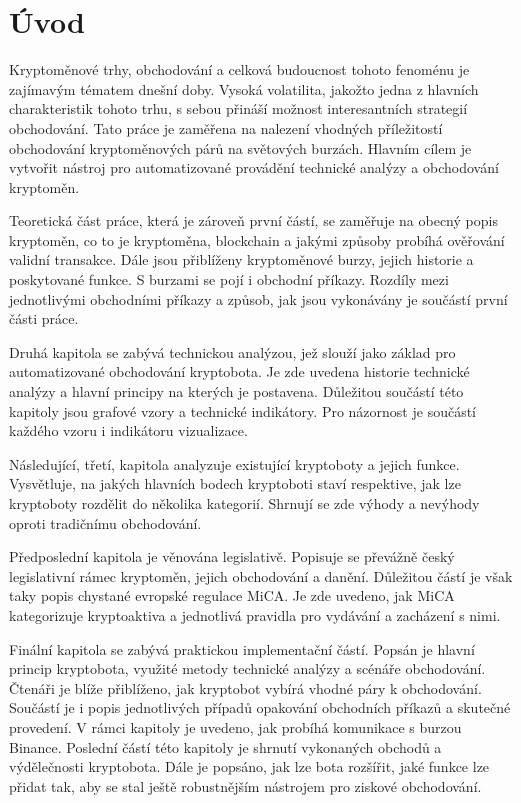 \chapter{Úvod}
\label{sec:Introduction}
Kryptoměnové trhy, obchodování a celková budoucnost tohoto fenoménu je zajímavým tématem dnešní doby. Vysoká volatilita, jakožto jedna z hlavních charakteristik tohoto trhu, s sebou přináší
možnost interesantních strategií obchodování. Tato práce je zaměřena na nalezení vhodných příležitostí obchodování kryptoměnových párů na světových burzách. Hlavním cílem
je vytvořit nástroj pro automatizované provádění technické analýzy a obchodování kryptoměn.

Teoretická část práce, která je zároveň první částí, se zaměřuje na obecný popis kryptoměn, co to je kryptoměna, blockchain a jakými způsoby probíhá ověřování validní transakce. Dále jsou
přiblíženy kryptoměnové burzy, jejich historie a poskytované funkce. S burzami se pojí i obchodní příkazy. Rozdíly mezi jednotlivými obchodními příkazy a způsob, jak jsou vykonávány je
součástí první části práce.

Druhá kapitola se zabývá technickou analýzou, jež slouží jako základ pro automatizované obchodování kryptobota. Je zde uvedena historie technické analýzy a hlavní principy
na kterých je postavena. Důležitou součástí této kapitoly jsou grafové vzory a technické indikátory. Pro názornost je součástí každého vzoru i indikátoru vizualizace.

Následující, třetí, kapitola analyzuje existující kryptoboty a jejich funkce. Vysvětluje, na jakých hlavních bodech kryptoboti staví respektive, jak lze kryptoboty rozdělit do několika
kategorií. Shrnují se zde výhody a nevýhody oproti tradičnímu obchodování.

Předposlední kapitola je věnována legislativě. Popisuje se převážně český legislativní rámec kryptoměn, jejich obchodování a danění. Důležitou částí je však taky popis chystané evropské
regulace MiCA. Je zde uvedeno, jak MiCA kategorizuje kryptoaktiva a jednotlivá pravidla pro vydávání a zacházení s nimi.

Finální kapitola se zabývá praktickou implementační částí. Popsán je hlavní princip kryptobota, využité metody technické analýzy a scénáře obchodování. Čtenáři je blíže přiblíženo, jak
kryptobot vybírá vhodné páry k obchodování. Součástí je i popis jednotlivých případů opakování obchodních příkazů a skutečné provedení. V rámci kapitoly je uvedeno, jak probíhá komunikace
s burzou Binance. Poslední částí této kapitoly je shrnutí vykonaných obchodů a výdělečnosti kryptobota. Dále je popsáno, jak lze bota rozšířit, jaké funkce lze přidat tak, aby se stal ještě
robustnějším nástrojem pro ziskové obchodování.

\endinput